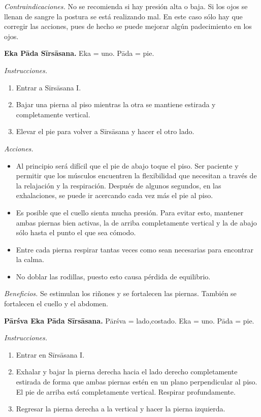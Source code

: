 \emph{Contraindicaciones.} No se recomienda
si hay presión alta o baja. Si los ojos se
llenan de sangre la postura se está
realizando mal. En este caso sólo hay que
corregir las acciones, pues de hecho se puede
mejorar algún padecimiento en los ojos.

\medskip\noindent\textbf{Eka Pāda Sīrsāsana.}
Eka = uno. Pāda = pie.

\emph{Instrucciones.}
\begin{enumerate}
\item Entrar a Sīrsāsana I.
\item Bajar una pierna al piso mientras la
otra se mantiene estirada y completamente
vertical.
\item Elevar el pie para volver a Sīrsāsana y
hacer el otro lado.
\end{enumerate}

\emph{Acciones.}
\begin{itemize}
\item Al principio será difícil que el pie de
abajo toque el piso. Ser paciente y permitir
que los músculos encuentren la flexibilidad
que necesitan a través de la relajación y la
respiración. Después de algunos segundos, en
las exhalaciones, se puede ir acercando cada
vez más el pie al piso.
\item Es posible que el cuello sienta mucha
presión. Para evitar esto, mantener ambas
piernas bien activas, la de arriba
completamente vertical y la de abajo sólo
hasta el punto el que sea cómodo.
\item Entre cada pierna respirar tantas veces
como sean necesarias para encontrar la calma.
\item No doblar las rodillas, puesto esto
causa pérdida de equilibrio.
\end{itemize}

\emph{Beneficios.} Se estimulan los riñones y
se fortalecen las piernas. También se
fortalecen el cuello y el abdomen.

\medskip\noindent\textbf{Pārśva Eka Pāda
Sīrsāsana.}
Pārśva = lado,costado. Eka = uno. Pāda = pie.

\emph{Instrucciones.}
\begin{enumerate}
\item Entrar en Sīrsāsana I.
\item Exhalar y bajar la pierna derecha hacia
el lado derecho completamente estirada de
forma que ambas piernas estén en un plano
perpendicular al piso. El pie de arriba está
completamente vertical. Respirar
profundamente.
\item Regresar la pierna derecha a la
vertical y hacer la pierna izquierda.
\end{enumerate}

